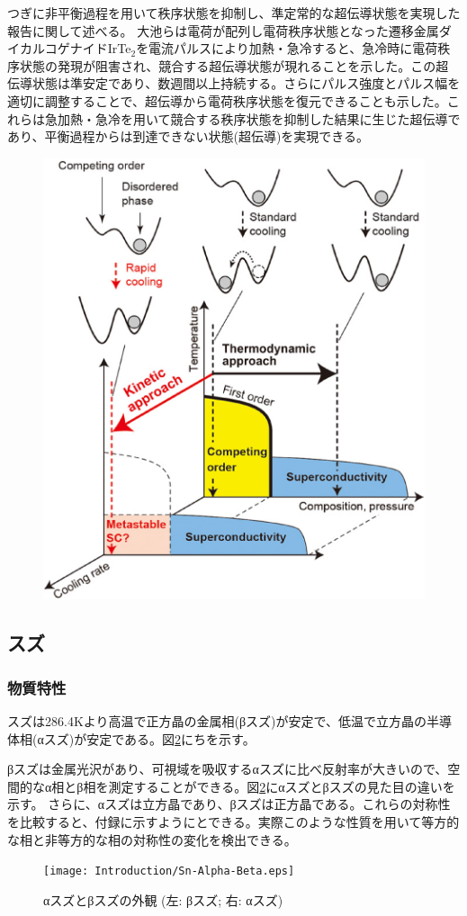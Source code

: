 つぎに非平衡過程を用いて秩序状態を抑制し、準定常的な超伝導状態を実現した報告に関して述べる。
大池らは電荷が配列し電荷秩序状態となった遷移金属ダイカルコゲナイドIrTe$_2$を電流パルスにより加熱・急冷すると、急冷時に電荷秩序状態の発現が阻害され、競合する超伝導状態が現れることを示した\cite{Oike}。この超伝導状態は準安定であり、数週間以上持続する。さらにパルス強度とパルス幅を適切に調整することで、超伝導から電荷秩序状態を復元できることも示した。これらは急加熱・急冷を用いて競合する秩序状態を抑制した結果に生じた超伝導であり、平衡過程からは到達できない状態(超伝導)を実現できる。
\begin{figure}[!h]
    \begin{center}
   \includegraphics[width=0.6\hsize]{Introduction/kinetic_approach.eps}
  \end{center}
  \caption{}
  \label{fig:phase_diagram2}
\end{figure}


\subsection{スズ}

\subsubsection{物質特性}
スズは286.4Kより高温で正方晶の金属相(βスズ)が安定で、低温で立方晶の半導体相(αスズ)が安定である。図\ref{fig:Sn-Alpha-Beta}にちを示す。


βスズは金属光沢があり、可視域を吸収するαスズに比べ反射率が大きいので、空間的なα相とβ相を測定することができる。図\ref{fig:Sn-Alpha-Beta}にαスズとβスズの見た目の違いを示す\cite{wiki}。
さらに、αスズは立方晶であり、βスズは正方晶である。これらの対称性を比較すると、付録に示すようにとできる。実際このような性質を用いて等方的な相と非等方的な相の対称性の変化を検出できる\cite{Matvienko}。
\begin{figure}[!h]
    \begin{center}
   \texttt{[image: Introduction/Sn-Alpha-Beta.eps]}
  \end{center}
  \caption{αスズとβスズの外観 (左: βスズ; 右: αスズ)}
  \label{fig:Sn-Alpha-Beta}
\end{figure}

